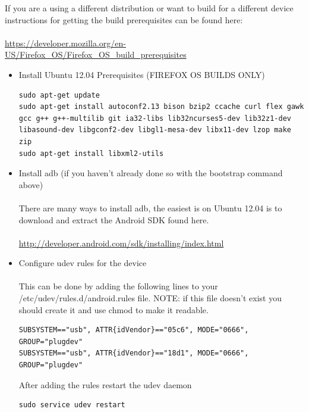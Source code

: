 \documentclass[12pt]{article}
\begin{document}
\begin{enumerate}
	If you are a using a different distribution or want to build for a different device instructions for getting the build prerequisites can be found here: \\ \\
	\href{https://developer.mozilla.org/en-US/Firefox\_OS/Firefox\_OS\_build\_prerequisites}{https://developer.mozilla.org/en-US/Firefox\_OS/Firefox\_OS\_build\_prerequisites}
	\begin{itemize}
		\item Install Ubuntu 12.04 Prerequisites (FIREFOX OS BUILDS ONLY) \\
		\begin{lstlisting}[style=BashInputStyle, breaklines=true]
sudo apt-get update
sudo apt-get install autoconf2.13 bison bzip2 ccache curl flex gawk gcc g++ g++-multilib git ia32-libs lib32ncurses5-dev lib32z1-dev libasound-dev libgconf2-dev libgl1-mesa-dev libx11-dev lzop make zip
sudo apt-get install libxml2-utils
			\end{lstlisting}
		\item Install adb (if you haven't already done so with the bootstrap command above) \\ \\
		There are many ways to install adb, the easiest is on Ubuntu 12.04 is to download and extract the Android SDK found here.\\ \\
		\href{http://developer.android.com/sdk/installing/index.html}{http://developer.android.com/sdk/installing/index.html}
		\item Configure udev rules for the device \\ \\
		This can be done by adding the following lines to your /etc/udev/rules.d/android.rules file.  NOTE: if this file doesn't exist you should create it and use chmod to make it readable.  
	\begin{lstlisting}[style=BashInputStyle, breaklines=true]
SUBSYSTEM=="usb", ATTR{idVendor}=="05c6", MODE="0666", GROUP="plugdev"
SUBSYSTEM=="usb", ATTR{idVendor}=="18d1", MODE="0666", GROUP="plugdev"
	\end{lstlisting}
		After adding the rules restart the udev daemon
		\begin{lstlisting}[style=BashInputStyle]
sudo service udev restart
		\end{lstlisting}	
	\end{itemize}
	\end{enumerate}	
\end{document}
